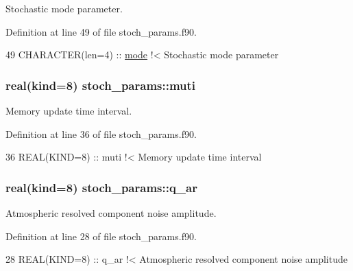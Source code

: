 Stochastic mode parameter. 



Definition at line 49 of file stoch\+\_\+params.\+f90.


\begin{DoxyCode}
49   \textcolor{keywordtype}{CHARACTER(len=4)} :: \hyperlink{namespacestoch__params_a2c3f6439fd2d66413d065b533f2a6263}{mode}\textcolor{comment}{           !< Stochastic mode parameter}
\end{DoxyCode}
\subsubsection[{\texorpdfstring{muti}{muti}}]{\setlength{\rightskip}{0pt plus 5cm}real(kind=8) stoch\+\_\+params\+::muti}\hypertarget{namespacestoch__params_a6cfc7910476036f19018641599841686}{}\label{namespacestoch__params_a6cfc7910476036f19018641599841686}


Memory update time interval. 



Definition at line 36 of file stoch\+\_\+params.\+f90.


\begin{DoxyCode}
36   \textcolor{keywordtype}{REAL(KIND=8)} :: muti\textcolor{comment}{                !< Memory update time interval}
\end{DoxyCode}
\subsubsection[{\texorpdfstring{q\+\_\+ar}{q_ar}}]{\setlength{\rightskip}{0pt plus 5cm}real(kind=8) stoch\+\_\+params\+::q\+\_\+ar}\hypertarget{namespacestoch__params_a56cee7780f23cbd0cc619c5b5bb30b6c}{}\label{namespacestoch__params_a56cee7780f23cbd0cc619c5b5bb30b6c}


Atmospheric resolved component noise amplitude. 



Definition at line 28 of file stoch\+\_\+params.\+f90.


\begin{DoxyCode}
28   \textcolor{keywordtype}{REAL(KIND=8)} :: q\_ar\textcolor{comment}{               !< Atmospheric resolved component noise amplitude}
\end{DoxyCode}
